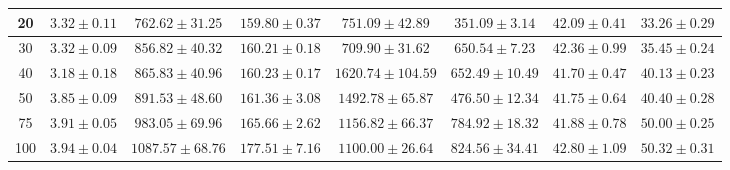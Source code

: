 \begin{table*}
\begin{center}
\begin{tabular}{|c||c|c|c|c|c|c|c|}
\hline
20 &$3.32\pm0.11$ & $762.62\pm31.25$  &  $159.80\pm0.37$  & $751.09\pm42.89$   &  $351.09\pm3.14$ &$42.09\pm0.41$ &  $33.26\pm0.29$   
\\
\hline 
 30  &$3.32\pm0.09$ & $856.82\pm40.32$  &  $160.21\pm0.18$  & $709.90\pm31.62$   &  $650.54\pm7.23$ &$42.36\pm0.99$ &  $35.45\pm0.24$  
\\
\hline
 40 & $3.18\pm0.18$ & $865.83\pm40.96$  &  $160.23\pm0.17$  & $1620.74\pm104.59$   &  $652.49\pm10.49$&$41.70\pm0.47$   &  $40.13\pm0.23$   
\\
\hline
 50  & $3.85\pm0.09$ & $891.53\pm48.60$  &  $161.36\pm3.08$  & $1492.78\pm65.87 $   &  $476.50\pm12.34$&$41.75\pm0.64$  &  $40.40\pm0.28$    
\\
\hline
 75  & $3.91\pm0.05$ & $983.05\pm69.96$  &  $165.66\pm2.62 $  & $1156.82\pm66.37$   &  $784.92\pm18.32$ &$41.88\pm0.78$ &  $50.00\pm0.25$  
\\
\hline
 100  & $3.94\pm0.04$ & $1087.57\pm68.76 $  &  $177.51\pm7.16$  & $1100.00\pm26.64$   &  $824.56\pm34.41$ &$42.80\pm1.09$ &  $50.32\pm0.31$    
\\
\hline
\end{tabular}
\end{center}\vspace{-0.26in}
\end{table*}
